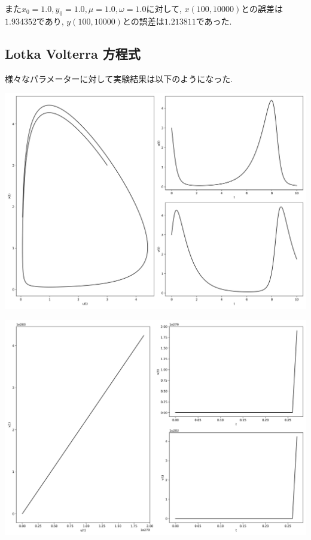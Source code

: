 \documentclass[12pt,a4paper]{jsarticle}
\makeatletter
\def\figcaption{\def\@captype{figure}\caption}
\makeatother
\begin{document}
\figcaption{$x_0=3.00, y_0=3.00, \mu=1,00, \omega=1.00, T = 100, N = 10000$}

また$x_0 = 1.0, y_0 = 1.0, \mu = 1.0, \omega = 1.0$に対して, $x(100, 10000)$との誤差は$1.934352$であり, $y(100, 10000)$との誤差は$1.213811$であった.

\subsection{Lotka Volterra 方程式}
様々なパラメーターに対して実験結果は以下のようになった.

\includegraphics[scale=0.33]{u3,0v3,0a11,0b10,0c1-1,0a2-1,0b21,0c20,0t1,00e+01n1,00e+03.png}
\figcaption{$u_0=3.00, v_0=3.00, a_1=1.00, b_1=0.00, c_1=-1.00, a_2=-1.00, b_2=0.00, c_2=0.00, T = 10, N = 1000$}
\includegraphics[scale=0.33]{u3,0v3,0a11,9b10,0c1-1,9a21,9b20,0c21,9t1,00e+01n1,00e+03.png}
\end{document}
